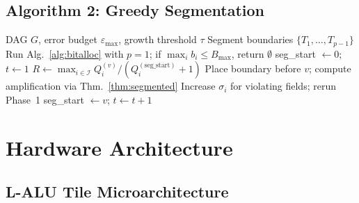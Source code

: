 \documentclass[11pt,a4paper]{article}
\theoremstyle{definition}
\theoremstyle{plain}
\theoremstyle{remark}
\begin{document}
\subsection{Algorithm 2: Greedy Segmentation}

\begin{algorithm}[H]
\caption{Greedy Segmentation with Error Budget}
\label{alg:segment}
\begin{algorithmic}[1]
\REQUIRE DAG $G$, error budget $\varepsilon_{\max}$, growth threshold $\tau$
\ENSURE Segment boundaries $\{T_1,\ldots,T_{p-1}\}$
\STATE Run Alg.~\ref{alg:bitalloc} with $p=1$; if $\max_i b_i\le B_{\max}$, return $\emptyset$
\STATE seg\_start $\leftarrow0$; $t\leftarrow1$
  \STATE $R\leftarrow\max_{i\in\mathcal{I}}Q_i^{(v)}/(Q_i^{(\text{seg\_start})}+1)$
    \STATE Place boundary before $v$; compute amplification via Thm.~\ref{thm:segmented}
      \STATE Increase $\sigma_i$ for violating fields; rerun Phase~1
    \ENDIF
    \STATE seg\_start $\leftarrow v$; $t\leftarrow t+1$
  \ENDIF
\ENDFOR
\end{algorithmic}
\end{algorithm}

\section{Hardware Architecture}
\label{sec:hw}

\subsection{L-ALU Tile Microarchitecture}
\end{document}
